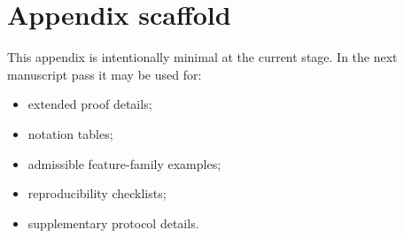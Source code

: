 \documentclass[11pt]{article}
\begin{document}
\appendix

\section{Appendix scaffold}

This appendix is intentionally minimal at the current stage. In the next manuscript pass it may be used for:
\begin{itemize}
    \item extended proof details;
    \item notation tables;
    \item admissible feature-family examples;
    \item reproducibility checklists;
    \item supplementary protocol details.
\end{itemize}



\end{document}
